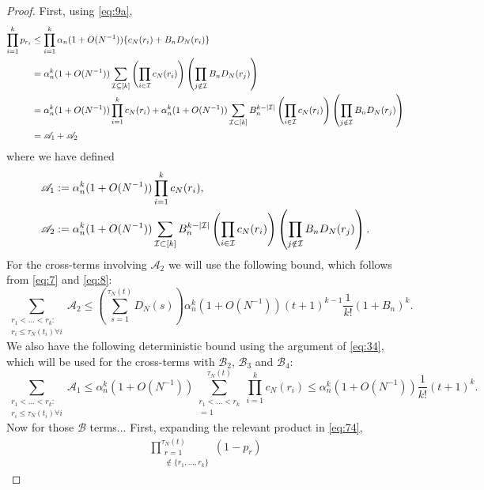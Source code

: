 \documentclass{article}
\newcommand{\1}[1]{\mathbbm{1}_{#1}}
\begin{document}
\begin{proof}
First, using \eqref{eq:9a},
\begin{align}
\prod_{i=1}^k p_{r_i} 
&\leq \prod_{i=1}^k \alpha_n (1+O(N^{-1})) \{ c_N(r_i) + B_n D_N(r_i) \} \notag\\
&= \alpha_n^k (1+O(N^{-1})) \sum_{\mathcal{I} \subseteq [k]}
\left( \prod_{i \in \mathcal{I}} c_N(r_i) \right)
\left( \prod_{j \notin \mathcal{I}} B_n D_N(r_j) \right) \notag\\
&= \alpha_n^k (1+O(N^{-1}))  \prod_{i=1}^k  c_N(r_i)
+ \alpha_n^k (1+O(N^{-1}))  \sum_{\mathcal{I} \subset [k]} B_n^{k - |\mathcal{I}|}
\left( \prod_{i \in \mathcal{I}} c_N(r_i) \right)
\left( \prod_{j \notin \mathcal{I}} B_n D_N(r_j) \right) \notag\\
& = \mathscr{A}_1 + \mathscr{A}_2
\end{align}
where we have defined
\begin{align}
&\mathscr{A}_1 := \alpha_n^k (1+O(N^{-1})) \prod_{i=1}^k  c_N(r_i) , \notag\\
&\mathscr{A}_2 := \alpha_n^k (1+O(N^{-1})) \sum_{\mathcal{I} \subset [k]} B_n^{k - |\mathcal{I}|}
\left( \prod_{i \in \mathcal{I}} c_N(r_i) \right)
\left( \prod_{j \notin \mathcal{I}} B_n D_N(r_j) \right) .\label{eq:78}
\end{align}
For the cross-terms involving $\mathscr{A}_2$ we will use the following bound, which follows from \eqref{eq:7} and \eqref{eq:8}:
\begin{equation}\label{eq:79}
\sum_{\substack{r_1 <\dots< r_k :\\ r_i \leq \tau_N(t_i) \forall i}} \mathscr{A}_2 
\leq \left( \sum_{s=1}^{\tau_N(t)} D_N(s) \right) 
\alpha_n^k (1+O(N^{-1})) (t+1)^{k-1} \frac{1}{k!} (1+B_n)^k .
\end{equation}
We also have the following deterministic bound using the argument of \eqref{eq:34}, which will be used for the cross-terms with $\mathscr{B}_2$, $\mathscr{B}_3$ and $\mathscr{B}_4$:
\begin{equation}\label{eq:80}
\sum_{\substack{r_1 <\dots< r_k :\\ r_i \leq \tau_N(t_i) \forall i}} \mathscr{A}_1
\leq \alpha_n^k (1+O(N^{-1})) \sum_{\substack{r_1 <\dots< r_k \\ =1}}^{\tau_N(t)} \prod_{i=1}^k c_N(r_i) 
\leq \alpha_n^k (1+O(N^{-1})) \frac{1}{k!} (t+1)^k .
\end{equation}
Now for those $\mathscr{B}$ terms... 
First, expanding the relevant product in \eqref{eq:74},
\begin{align}
\prod_{\substack{r=1 \\ \notin \{r_1,\dots,r_k\} }}^{\tau_N(t)} (1-p_r)

\end{align}
\end{proof}
\end{document}
